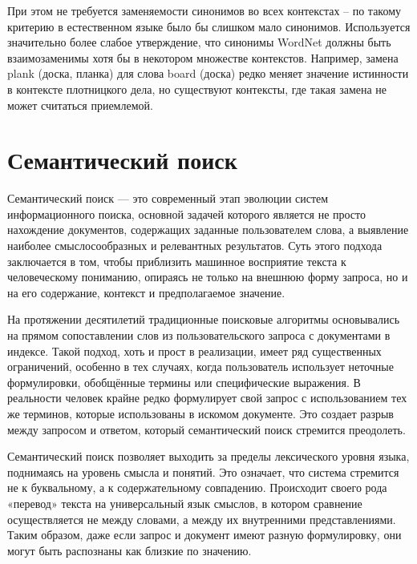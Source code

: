 \documentclass[coursework]{SCWorks}
\begin{document}
При этом не требуется заменяемости синонимов во всех контекстах – по такому 
критерию в естественном языке было бы слишком мало синонимов. Используется 
значительно более слабое утверждение, что синонимы WordNet должны быть 
взаимозаменимы хотя бы в некотором множестве контекстов. Например, замена plank (доска, планка) для слова board (доска) редко меняет значение истинности в контексте плотницкого дела, но существуют контексты, где такая замена не может считаться приемлемой.


\section{Семантический поиск}
Семантический поиск — это современный этап эволюции систем информационного поиска, основной задачей которого является не просто нахождение документов, содержащих заданные пользователем слова, а выявление наиболее смыслосообразных и релевантных результатов. Суть этого подхода заключается в том, чтобы приблизить машинное восприятие текста к человеческому пониманию, опираясь не только на внешнюю форму запроса, но и на его содержание, контекст и предполагаемое значение.

На протяжении десятилетий традиционные поисковые алгоритмы основывались на прямом сопоставлении слов из пользовательского запроса с документами в индексе. Такой подход, хоть и прост в реализации, имеет ряд существенных ограничений, особенно в тех случаях, когда пользователь использует неточные формулировки, обобщённые термины или специфические выражения. В реальности человек крайне редко формулирует свой запрос с использованием тех же терминов, которые использованы в искомом документе. Это создает разрыв между запросом и ответом, который семантический поиск стремится преодолеть.

Семантический поиск позволяет выходить за пределы лексического уровня языка, поднимаясь на уровень смысла и понятий. Это означает, что система стремится не к буквальному, а к содержательному совпадению. Происходит своего рода «перевод» текста на универсальный язык смыслов, в котором сравнение осуществляется не между словами, а между их внутренними представлениями. Таким образом, даже если запрос и документ имеют разную формулировку, они могут быть распознаны как близкие по значению.
\end{document}
